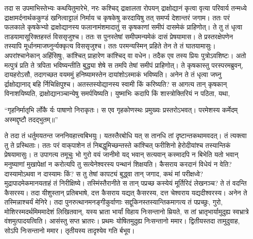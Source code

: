 \adhyAya
{}
\vakya तदा स उपमाभिस्तेभ्यः कथयितुमारेभे, नरः कश्चिद् द्राक्षालता रोपयन् द्राक्षोद्यानं कृत्वा वृत्या परिवार्य तन्मध्ये द्राक्षामर्दनार्थककुण्डं खनित्वाट्टालं निर्माय च कृषकेषु करदायिषु तत् समर्प्य देशान्तरं जगाम।
\vakya ततः परं फलकाले कृषकेभ्यो द्राक्षोद्यानस्य फलानामंशमादातुं स कृषकाणां समीपं दासमेकं प्राहिणोत्।
\vakya ते तु तं धृत्वा ताडयामासूरिक्तहस्तं विससृजुश्च।
\vakya ततः स पुनस्तेषां समीपमन्यमेकं दासं प्रेषयामास। ते प्रस्तरक्षेपणेन तस्यापि मूर्धानमाजघ्नुर्न्यक्कृत्य विससृजुश्च।
\vakya ततः परमन्यस्मिन् प्रहिते तेन ते तं घातयामासुः। अपरांश्चानेकान् अहिंसिषुः, कांश्चित् प्राहारेण कांश्चिद् वा वधेन।
\vakya तदैक एव तस्य प्रियः पुत्रोऽवशिष्टः। अतो मत्पुत्रं प्रति ते त्रपिता भविष्यन्तीति बुद्ध्या शेषे स तमपि तेषां समीपं प्राहिणोत्।
\vakya ते कृषकास्तु परस्परमब्रुवन्, दायहरोऽसौ, तदागच्छत वयममुं हनिष्यामस्तेन दायांशोऽस्माकं भविष्यति।
\vakya अनेन ते तं धृत्वा जघ्नु र्द्राक्षोद्यानाद् बहि र्निचिक्षिपुश्च।
\vakya अतस्तस्योद्यानस्य स्वामी किं करिष्यति? स आगत्य तान् कृषकान् विनाशयिष्यति, द्राक्षोद्यानञ्चान्येषु समर्पयिष्यति।
\vakya युष्माभिः कदापि किं शास्त्रोक्तिरियं न पठिता, यथा,
\begin{poem}
\startwithline “गृहनिर्मातृभि र्लोकै र्यः पाषाणो निराकृतः।
\pline स एव गृहकोणस्थः प्रमुख्यः प्रस्तरोऽभवत्।
\vakya परमेशस्य कर्मेदम् अस्मद्दृष्टौ तदद्भुतम्॥”
\end{poem}
\vakya ते तदा तं धर्तुमयतन्त जननिवहात्त्वबिभयुः। यतस्तैरबोधि यत् स तानधि तां दृष्टान्तकथामवदत्। तं त्यक्त्वा तु ते प्रस्थिताः।
\vakya ततः परं वाक्‌पाशेन तं निबद्धुमिच्छन्तस्ते कांश्चित् फरीशिनो हेरोदीयांश्च तस्यान्तिकं प्रेषयामासुः।
\vakya त उपागत्य तमूचुः भो गुरो वयं जानीमो यद् भवान् सत्यवान् कस्मादपि न बिभेति यतो भवान् मनुष्याणां मुखापेक्षां न करोत्यपि तु सत्येनेश्वरस्य पन्थानं शिक्षयति। कैसराय करदानं विधेयं न वेति? दास्यामोऽथवा न दास्यामः किं?
\vakya स तु तेषां कापट्यं बुद्ध्वा तान् जगाद, कथं मां परीक्षध्वे? मुद्रापादमेकमानयताहं तं निरीक्षिष्ये।
\vakya तस्मिंस्तैरानीते स तान् पप्रच्छ कस्येयं मूर्तिरिदं लेखनञ्च? ते तं वदन्ति कैसरस्य।
\vakya तदा यीशुस्तान् प्रतिबभाषे, दत्त कैसराय यद्यत् कैसरस्य, दत्त चेश्वराय यद्यदीश्वरस्य। अनेन ते तस्मिन्नाश्चर्यं मेनिरे।
\vakya तदा पुनरुत्थानमनङ्गीकुर्वाणाः सद्दूकिनस्तस्यान्तिकमागत्य तं पप्रच्छुः,
\vakya गुरो, मोशिरस्मदर्थमिममादेशं लिखितवान्, यस्य भ्राता भार्यां विहाय निःसन्तानो म्रियते, स तां भ्रातृभार्यामुदुह्य स्वभ्रात्रे वंशमुत्पादयत्विति।
\vakya आसंस्तु सप्त भ्रातरः। प्रथमः योषितमुदुह्य निःसन्तानो ममार।
\vakya द्वितीयस्तदा तामुदुवाह, सोऽपि निःसन्तानो ममार। तृतीयस्य तादृश्येव गति र्बभूव।
